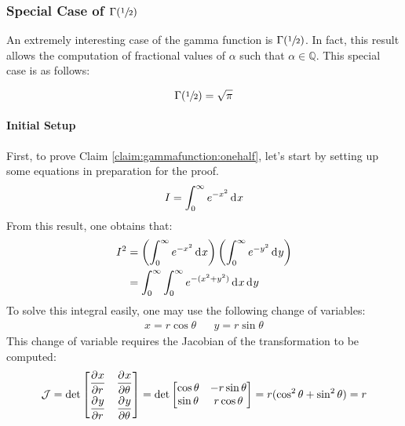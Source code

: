 \documentclass[12pt]{article}
\newcommand{\J}{\mathcal{J}}
\begin{document}
\pagebreak
\subsubsection{Special Case of $\Gamma(\sfrac{1}{2})$}
An extremely interesting case of the gamma function is $\Gamma(\sfrac{1}{2})$. In fact, this result allows the
computation of fractional values of $\alpha$ such that $\alpha\in\mathbb{Q}$. This special case is as follows:
\begin{claim}\label{claim:gammafunction:onehalf}
	\begin{equation*}
		\Gamma(\sfrac{1}{2})=\sqrt{\pi}
	\end{equation*}
\end{claim}

\paragraph{Initial Setup}
First, to prove Claim \ref{claim:gammafunction:onehalf}, let's start by setting up some equations in preparation for the
proof.
\begin{equation}\label{eq:gammafunction:i}
	I = \int^\infty_0 e^{-x^2}\mathop{}\!\mathrm{d^{}}x
\end{equation}
From this result, one obtains that:
\begin{equation}\label{eq:gammafunction:isquared}
	\begin{split}
		I^2	&=	\left(\int^\infty_0 e^{-x^2}\mathop{}\!\mathrm{d^{}}x\right)\left(\int^\infty_0 e^{-y^2}\mathop{}\!\mathrm{d^{}}y\right)\\
			&=	\int^\infty_0\int^\infty_0 e^{-(x^2+y^2)}\mathop{}\!\mathrm{d^{}}x\mathop{}\!\mathrm{d^{}}y
	\end{split}
\end{equation}
To solve this integral easily, one may use the following change of variables:
\begin{align*}
	x=r\cos\theta	&&	y=r\sin\theta
\end{align*}
This change of variable requires the Jacobian of the transformation to be computed:
\begin{equation}\label{eq:gammafunction:jacobian}
	\J = \det\begin{bmatrix}
		\pderiv{x}{r}	&	\pderiv{x}{\theta}\\[6pt]
		\pderiv{y}{r}	&	\pderiv{y}{\theta}
		\end{bmatrix} = \det\begin{bmatrix}
			\cos\theta	&	-r\sin\theta\\
			\sin\theta	&	r\cos\theta
		\end{bmatrix} = r(\cos^2\theta + \sin^2\theta) = r
\end{equation}
\end{document}

